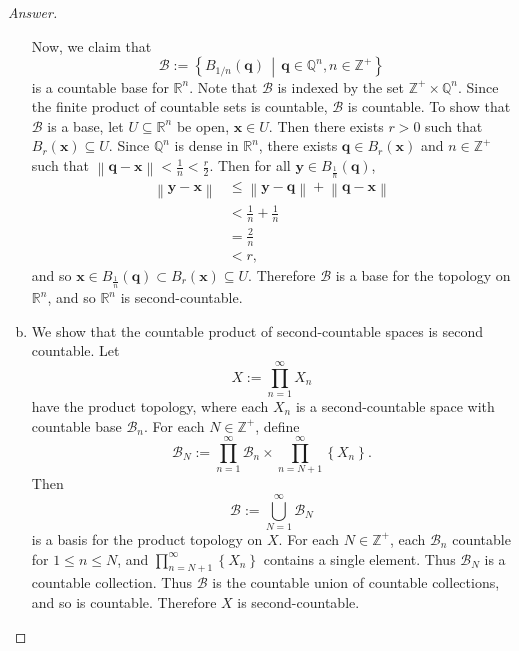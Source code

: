 \documentclass[12pt]{article}
\newcommand{\z}{\mathbb{Z}}
\newcommand{\q}{\mathbb{Q}}
\newcommand{\real}{\mathbb{R}}
\newcommand\setb[1]{\left \{ #1 \right \}}
\newcommand{\norm}[1]{\left \| #1 \right \|}
\theoremstyle{definition}
\begin{document}
\begin{proof}[Answer]
\begin{enumerate}[(a)]
        Now, we claim that 
        \[
            \mathcal{B} := \setb{ B_{1/n} (\mathbf{q} ) \, \middle| \, \mathbf{q} \in \q^n , n \in \z^+ }
        \]
        is a countable base for $\real^n$. Note that $\mathcal{B}$ is indexed by the set $\z^+ \times \q^n$. Since the finite product of countable sets is countable, $\mathcal{B}$ is countable. To show that $\mathcal{B}$ is a base, let $U \subseteq \real^n$ be open, $\mathbf{x} \in U$. Then there exists $r > 0$ such that $B_r(\mathbf{x}) \subseteq U$. Since $\q^n$ is dense in $\real^n$, there exists $\mathbf{q} \in B_r(\mathbf{x})$ and $n \in \z^+$ such that $\norm{ \mathbf{q} - \mathbf{x} } < \frac{1}{n} < \frac{r}{2}$. Then for all $\mathbf{y} \in B_{\frac{1}{n}}(\mathbf{q})$, 
        \begin{align*}
            \norm{ \mathbf{y} - \mathbf{x} } & \leq \norm{ \mathbf{y} - \mathbf{q} } + \norm{ \mathbf{q} - \mathbf{x} } \\
            & < \frac{1}{n} + \frac{1}{n} \\
            & = \frac{2}{n} \\
            & < r,
        \end{align*}
        and so $\mathbf{x} \in B_{\frac{1}{n}}(\mathbf{q}) \subset B_{r}(\mathbf{x}) \subseteq U$. Therefore $\mathcal{B}$ is a base for the topology on $\real^n$, and so $\real^n$ is second-countable.
        \item We show that the countable product of second-countable spaces is second countable. Let 
        \[
            X := \prod\limits_{n = 1}^{\infty} X_n
        \]
        have the product topology, where each $X_n$ is a second-countable space with countable base $\mathcal{B}_n$. For each $N \in \z^+$, define
        \[
            \mathscr{B}_N := \prod\limits_{n = 1}^{\infty} \mathcal{B}_n \times \prod\limits_{n = N + 1}^{\infty} \setb{ X_n }.
        \]
        Then 
        \[
            \mathscr{B} := \bigcup\limits_{N = 1}^{\infty} \mathscr{B}_N
        \]
        is a basis for the product topology on $X$. For each $N \in \z^+$, each $\mathcal{B}_n$ countable for $1 \leq n \leq N$, and $\prod\limits_{n = N + 1}^{\infty} \setb{ X_n }$ contains a single element. Thus $\mathscr{B}_N$ is a countable collection. Thus $\mathscr{B}$ is the countable union of countable collections, and so is countable. Therefore $X$ is second-countable. 
    \end{enumerate}
\end{proof}
\end{document}
